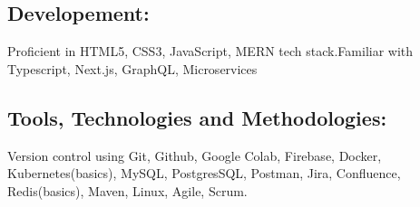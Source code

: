 \documentclass{article}
\begin{document}
\subsection*{Developement:}
Proficient in HTML5, CSS3, JavaScript, MERN tech stack.Familiar with Typescript, Next.js, GraphQL, Microservices

\subsection*{Tools, Technologies and Methodologies:}
Version control using Git, Github, Google Colab, Firebase, Docker, Kubernetes(basics), MySQL, PostgresSQL, Postman, Jira, Confluence, Redis(basics), Maven, Linux, Agile, Scrum.




\end{document}
